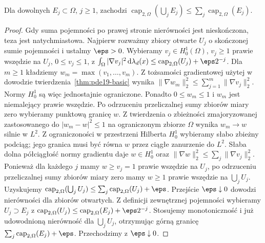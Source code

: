 \begin{lemat}
\label{lem:pde19-countable}
Dla dowolnych $E_j\subset\Omega$, $j\ge1$, zachodzi
$\operatorname{cap}_{2,\Omega}(\bigcup_jE_j)
 \le\sum_j\operatorname{cap}_{2,\Omega}(E_j)$.
\end{lemat}
\begin{proof}
Gdy suma pojemności po prawej stronie nierówności
jest nieskończona, teza jest natychmiastowa.
Najpierw rozważmy zbiory otwarte $U_j$ o skończonej sumie
pojemności i ustalmy $\eps>0$. Wybieramy $v_j\in H_0^1(\Omega)$, $v_j\ge1$
prawie wszędzie na $U_j$, $0\le v_j\le1$, z
$\int_\Omega|\nabla v_j|^2\,\mathrm d\lambda_d(x)\le\operatorname{cap}_{2,\Omega}(U_j)
 +\eps 2^{-j}$. Dla $m\ge1$ kładziemy
$w_m=\max(v_1,\ldots,v_m)$. Z tożsamości gradientowej
użytej w dowodzie twierdzenia~\ref{thm:pde19-basic}
wynika $\|\nabla w_m\|_2^2\le\sum_{j=1}^m
\|\nabla v_j\|_2^2$. Normy $H_0^1$ są więc jednostajnie
ograniczone. Ponadto $0\le w_m\le1$ i $w_m$ jest
niemalejący prawie wszędzie. Po odrzuceniu przeliczalnej
sumy zbiorów miary zero wybieramy punktową granicę $w$.
Z twierdzenia o zbieżności zmajoryzowanej zastosowanego
do $|w_m-w|^2\le1$ na ograniczonym zbiorze $\Omega$
wynika $w_m\to w$ silnie w $L^2$.
Z ograniczoności w przestrzeni Hilberta $H_0^1$
wybieramy słabo zbieżny podciąg; jego granica musi być
równa $w$ przez ciągłe zanurzenie do $L^2$.
Słaba dolna półciągłość normy gradientu daje
$w\in H_0^1$ oraz
$\|\nabla w\|_2^2\le\sum_j\|\nabla v_j\|_2^2$.
Ponieważ dla każdego $j$ mamy $w\ge v_j=1$
prawie wszędzie na $U_j$, po odrzuceniu przeliczalnej
sumy zbiorów miary zero mamy $w\ge1$ prawie wszędzie
na $\bigcup_jU_j$. Uzyskujemy
$\operatorname{cap}_{2,\Omega}(\bigcup_jU_j)
\le\sum_j\operatorname{cap}_{2,\Omega}(U_j)+\eps$.
Przejście $\eps\downarrow0$ dowodzi nierówności
dla zbiorów otwartych.
Z definicji zewnętrznej pojemności wybieramy
$U_j\supset E_j$ z
$\operatorname{cap}_{2,\Omega}(U_j)
\le\operatorname{cap}_{2,\Omega}(E_j)+\eps2^{-j}$.
Stosujemy monotoniczność i już udowodnioną nierówność
dla $\bigcup_jU_j$, otrzymując górną granicę
$\sum_j\operatorname{cap}_{2,\Omega}(E_j)+\eps$.
Przechodzimy z $\eps\downarrow0$.
\end{proof}

